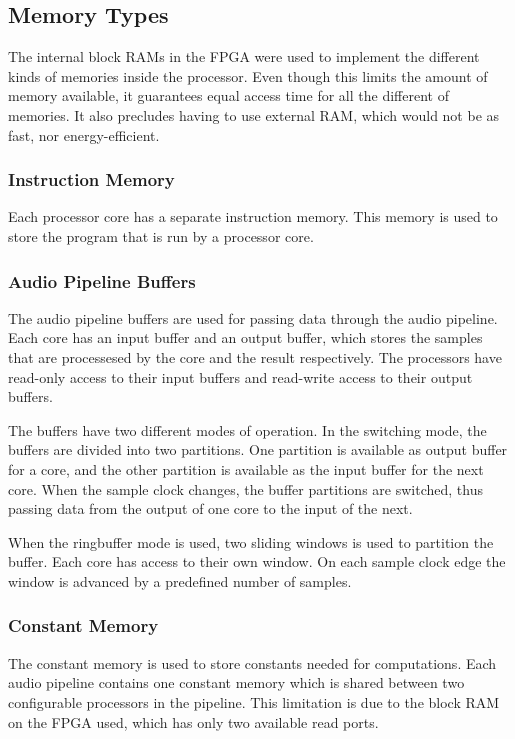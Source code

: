 
\subsection{Memory Types}\label{subsec:fpga-memory}

The internal block RAMs in the FPGA were used to implement the different kinds
of memories inside the processor. Even though this limits the amount of
memory available, it guarantees equal access time for all the different
of memories. It also precludes having to use external RAM, which would not be as
fast, nor energy-efficient.

\subsubsection{Instruction Memory}
Each processor core has a separate instruction memory. This memory is used to
store the program that is run by a processor core.

\subsubsection{Audio Pipeline Buffers}
The audio pipeline buffers are used for passing data through the audio pipeline.
Each core has an input buffer and an output buffer, which stores the samples
that are processesed by the core and the result respectively. The processors
have read-only access to their input buffers and read-write access to their
output buffers.

The buffers have two different modes of operation. In the switching mode,
the buffers are divided into two partitions. One partition is available
as output buffer for a core, and the other partition is available as the
input buffer for the next core. When the sample clock 
changes, the buffer partitions are switched, thus passing data from the
output of one core to the input of the next.

When the ringbuffer mode is used, two sliding windows is used to partition
the buffer. Each core has access to their own window. On each sample clock
edge the window is advanced by a predefined number
of samples.

\subsubsection{Constant Memory}
The constant memory is used to store constants needed for computations. Each
audio pipeline contains one constant memory which is shared between two
configurable processors in the pipeline. This limitation is due to the block
RAM on the FPGA used, which has only two available read ports.

